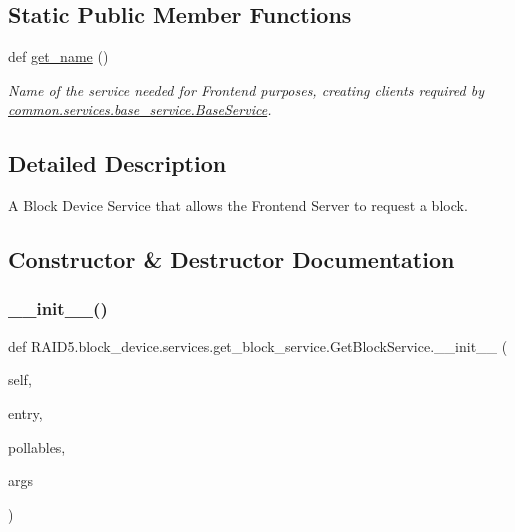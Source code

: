 \subsection*{Static Public Member Functions}
\begin{DoxyCompactItemize}
\item 
def \hyperlink{class_r_a_i_d5_1_1block__device_1_1services_1_1get__block__service_1_1_get_block_service_a813d2b4bd5bc7a7fea09475792396db2}{get\+\_\+name} ()
\begin{DoxyCompactList}\small\item\em Name of the service needed for Frontend purposes, creating clients required by \hyperlink{class_r_a_i_d5_1_1common_1_1services_1_1base__service_1_1_base_service}{common.\+services.\+base\+\_\+service.\+Base\+Service}. \end{DoxyCompactList}\end{DoxyCompactItemize}


\subsection{Detailed Description}
A Block Device Service that allows the Frontend Server to request a block. 

\subsection{Constructor \& Destructor Documentation}
\mbox{\label{class_r_a_i_d5_1_1block__device_1_1services_1_1get__block__service_1_1_get_block_service_a6fe680bf73350c7bdb9f97266b6fa6ca}} 
\subsubsection{\texorpdfstring{\+\_\+\+\_\+init\+\_\+\+\_\+()}{\_\_init\_\_()}}
{\footnotesize\ttfamily def R\+A\+I\+D5.\+block\+\_\+device.\+services.\+get\+\_\+block\+\_\+service.\+Get\+Block\+Service.\+\_\+\+\_\+init\+\_\+\+\_\+ (\begin{DoxyParamCaption}\item[{}]{self,  }\item[{}]{entry,  }\item[{}]{pollables,  }\item[{}]{args }\end{DoxyParamCaption})}



